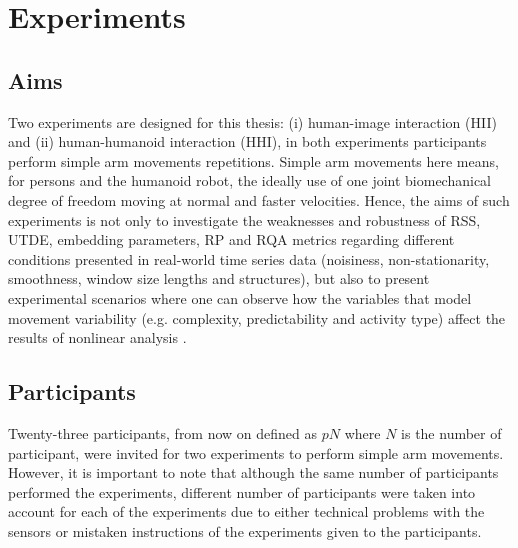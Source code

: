 \chapter{Experiments} \label{chapter4}

%
\graphicspath{{figs/chapter4/PDF/}}

\section{Aims}
Two experiments are designed for this thesis: 
(i) human-image interaction (HII) and 
(ii) human-humanoid interaction (HHI), in both experiments 
participants perform simple arm movements repetitions.
Simple arm movements here means, for persons and the humanoid robot, 
the ideally use of one joint biomechanical degree of freedom moving at 
normal and faster velocities.
Hence, the aims of such experiments is not only to investigate the weaknesses and 
robustness of RSS, UTDE, embedding parameters, RP and RQA metrics regarding 
different conditions presented in real-world time series data 
(noisiness, non-stationarity, smoothness, window size lengths and structures), 
but also to present experimental scenarios where one can observe 
how the variables that model movement variability
(e.g. complexity, predictability and activity type)
affect the results of nonlinear analysis 
\citep{stergiou2006, vaillancourt2002, vaillancourt2003}.

\section{Participants}
Twenty-three participants, from now on defined as $pN$ where $N$ is the 
number of participant, were invited for two experiments to perform 
simple arm movements. 
However, it is important to note that although the same number of 
participants performed the experiments, different number of participants 
were taken into account for each of the experiments due to either 
technical problems with the sensors or 
mistaken instructions of the experiments given to the participants.

